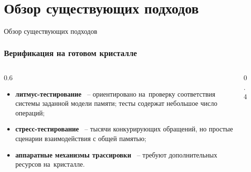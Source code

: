 \section{Обзор существующих подходов}
\begin{frame}[plain]
  \begin{center}
    \Huge
    Обзор существующих подходов
  \end{center}
\end{frame}

\begin{frame}
  \frametitle{Верификация на готовом кристалле}
  \begin{columns}
    \begin{column}{0.6\textwidth}
      \begin{itemize}
        \item \textbf{литмус-тестирование}~\cite{litmus2} --
          ориентировано на~проверку
          соответствия системы заданной модели памяти; тесты содержат
          небольшое число операций;
        \item \textbf{стресс-тестирование}~\cite{manovit, Axe} --
          тысячи конкурирующих
          обращений, но простые сценарии взаимодействия с общей памятью;
        \item \textbf{аппаратные механизмы
          трассировки}~\cite{post-silicon} -- требуют
          дополнительных ресурсов на~кристалле.
      \end{itemize}
    \end{column}
    \begin{column}{0.4\textwidth}
      
    \end{column}
  \end{columns}

\end{frame}

